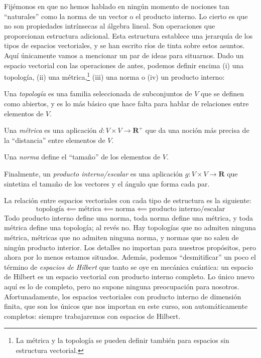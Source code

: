 Fijémonos en que no hemos hablado en ningún momento de nociones tan ``naturales'' como la norma de un vector o el producto interno. Lo cierto es que no son propiedades intrínsecas al álgebra lineal. Son operaciones que proporcionan estructura adicional. Esta estructura establece una jerarquía de los tipos de espacios vectoriales, y se han escrito ríos de tinta sobre estos asuntos. Aquí únicamente vamos a mencionar un par de ideas para situarnos. Dado un espacio vectorial con las operaciones de antes, podemos definir encima (i) una topología, (ii) una métrica,\footnote{La métrica y la topología se pueden definir también para espacios sin estructura vectorial.} (iii) una norma o (iv) un producto interno:
\begin{myitemize}
    \item Una \emph{topología} es una familia seleccionada de subconjuntos de \(V\) que se definen como abiertos, y es lo más básico que hace falta para hablar de relaciones entre elementos de \(V\). 
    \item Una \emph{métrica} es una aplicación \(d:V\times V\rightarrow\mathbf{R}^+\) que da una noción más precisa de la ``distancia'' entre elementos de \(V\). 
    \item Una \emph{norma} define el ``tamaño'' de los elementos de \(V\). 
    \item Finalmente, un \emph{producto interno/escalar} es una aplicación \(g:V\times V\rightarrow \mathbf{R}\) que sintetiza el tamaño de los vectores y el ángulo que forma cada par. 
\end{myitemize}

La relación entre espacios vectoriales con cada tipo de estructura es la siguiente:
\begin{equation*}
    \text{topología} 
    \impliedby 
    \text{métrica} 
    \impliedby
    \text{norma} 
    \impliedby
    \text{producto interno/escalar}
\end{equation*}
Todo producto interno define una norma, toda norma define una métrica, y toda métrica define una topología; al revés no. Hay topologías que no admiten ninguna métrica, métricas que no admiten ninguna norma, y normas que no salen de ningún producto interior. Los detalles no importan para nuestros propósitos, pero ahora por lo menos estamos situados. Además, podemos ``desmitificar'' un poco el término de \emph{espacios de Hilbert} que tanto se oye en mecánica cuántica: un espacio de Hilbert es un espacio vectorial con producto interno completo. Lo único nuevo aquí es lo de completo, pero no supone ninguna preocupación para nosotros. Afortunadamente, los espacios vectoriales con producto interno de dimensión finita, que son los únicos que nos importan en este curso, son automáticamente completos: siempre trabajaremos con espacios de Hilbert. 

